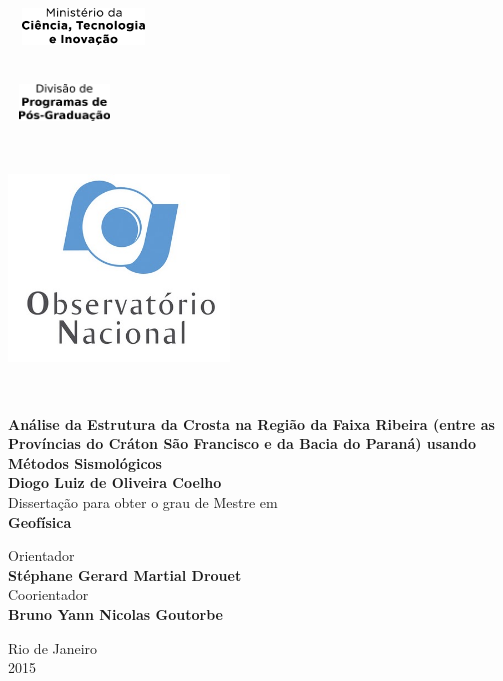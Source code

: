 \setcounter{page}{1} 


\thispagestyle{empty}
\begin{flushleft} ~\\ \vspace{-10mm} \hspace{-5mm}  \includegraphics[width=40mm, height=10mm]{mcti} 
\begin{flushright}~\\ \vspace{-20mm} \hspace{-9mm}  \includegraphics[width=30mm, height=10mm]{dppg} 
\end{flushright}


~\\ \begin{center} \includegraphics[height=50mm]{logo_on}  \end{center} %
~\\ \vspace{5mm}
\begin{centering}
\LARGE \textbf{Análise da Estrutura da Crosta na Região da Faixa Ribeira (entre as Províncias do Cráton São Francisco e da Bacia do Paraná) usando Métodos Sismológicos}
\\ \vspace{20mm}
\Large \textbf{Diogo Luiz de Oliveira Coelho} \\
\vspace{20mm}
\Large Dissertação para obter o grau de Mestre em
\\ \vspace{2mm}
\LARGE \textbf{Geofísica}
\\ \vspace{20mm}

\Large Orientador\\
\textbf{Stéphane Gerard Martial Drouet} \\
\Large Coorientador\\
\textbf{Bruno Yann Nicolas Goutorbe} \\
 
\vspace{20mm}

Rio de Janeiro \\
2015 \\
\end{centering}
\let\thepage\relax
\end{flushleft}
\pagebreak